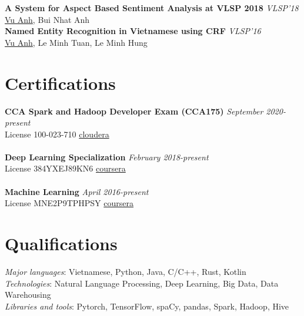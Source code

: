 \documentclass[11pt,a4paper,roman]{article}
\begin{document}
\noindent
\textbf{A System for Aspect Based Sentiment Analysis at VLSP 2018}
\hfill
\textit{VLSP'18} \\
\underline{Vu Anh}, Bui Nhat Anh
\\

\noindent
\textbf{Named Entity Recognition in Vietnamese using CRF}
\hfill
\textit{VLSP'16} \\
\underline{Vu Anh}, Le Minh Tuan, Le Minh Hung

\section{Certifications}

\textbf{CCA Spark and Hadoop Developer Exam (CCA175)}
\hfill
\textit{September 2020-present} \\
License 100-023-710
\hfill
\href{http://certification.cloudera.com/verify/user}{cloudera}
\\\\
\textbf{Deep Learning Specialization}
\hfill
\textit{February 2018-present} \\
License 384YXEJ89KN6
\hfill
\href{https://www.coursera.org/account/accomplishments/verify/384YXEJ89KN6}{coursera}
\\\\
\textbf{Machine Learning}
\hfill
\textit{April 2016-present} \\
License MNE2P9TPHPSY
\hfill
\href{https://www.coursera.org/account/accomplishments/verify/MNE2P9TPHPSY}{coursera} 

\section{Qualifications}

\textit{Major languages}: Vietnamese, Python, Java, C/C++, Rust, Kotlin
\\
\textit{Technologies}: Natural Language Processing, Deep Learning, Big Data, Data Warehousing
\\
\textit{Libraries and tools}: Pytorch, TensorFlow, spaCy, pandas, Spark, Hadoop, Hive
\end{document}
